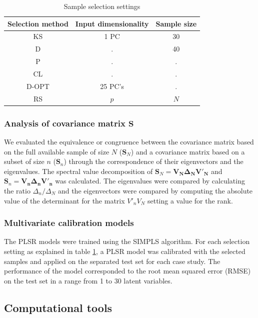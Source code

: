 \documentclass{article}
\begin{document}
\begin{table}[t]
\centering
\begin{tabular}{|c|c|c|} 
\hline
Selection method	& Input dimensionality	& Sample size	\\
\hline

KS & 1 PC   & 30  \\
D &  . & 40\\
P &  . & . \\
CL & . & . \\
D-OPT & 25 PC's & .\\
RS & $p$ & $N$\\
\hline


\end{tabular}
\caption{Sample selection settings}
\label{tab_samplesel_settings_exhaustive_search}
\end{table}

\subsubsection*{Analysis of covariance matrix $\mathbf{S}$}

We evaluated the equivalence or congruence between the covariance matrix based on the full available sample of size $N$ ($\mathbf{S}_N$) and a covariance matrix based on a subset of size $n$ ($\mathbf{S}_n$) through the correspondence of their eigenvectors and the eigenvalues. The spectral value decomposition of $\mathbf{S}_N = \mathbf{V_N \Delta_N V'_N}$ and $\mathbf{S}_n = \mathbf{V_n \Delta_n V'_n}$ was calculated. The eigenvalues were compared by calculating the ratio  $\Delta_n/\Delta_N$ and the eigenvectors were compared by computing the absolute value of the determinant for the matrix $V'_nV_N$ setting a value for the rank. 

\subsubsection*{Multivariate calibration models}

The PLSR models were trained using the SIMPLS algorithm. For each selection setting as explained in table \ref{tab_samplesel_settings_exhaustive_search}, a PLSR model was calibrated with the selected samples and applied on the separated test set for each case study. The performance of the model corresponded to the root mean squared error (RMSE) on the test set in a range from 1 to 30 latent variables. 

\subsection*{Computational tools}
\end{document}

